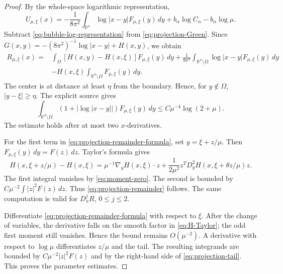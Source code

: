 \documentclass[11pt]{article}
\numberwithin{equation}{section}
\begin{document}
\begin{proof}
By the whole-space logarithmic representation,
\begin{equation}\label{eq:bubble-log-representation}
U_{\mu,\xi}(x)
=-\frac1{8\pi^2}\int_{\mathbb R^4}
\log|x-y|F_{\mu,\xi}(y)\,dy
+b_\alpha\log C_\alpha-b_\alpha\log\mu.
\end{equation}
Subtract \eqref{eq:bubble-log-representation} from
\eqref{eq:projection-Green}. Since
$G(x,y)=-(8\pi^2)^{-1}\log|x-y|+H(x,y)$, we obtain
\begin{equation}\label{eq:projection-remainder-formula}
\begin{aligned}
R_{\mu,\xi}(x)
={}&\int_\Omega[H(x,y)-H(x,\xi)]F_{\mu,\xi}(y)\,dy+\frac1{8\pi^2}\int_{\mathbb R^4\setminus\Omega}
\log|x-y|F_{\mu,\xi}(y)\,dy\\
&-H(x,\xi)\int_{\mathbb R^4\setminus\Omega}
F_{\mu,\xi}(y)\,dy.
\end{aligned}
\end{equation}
The center is at distance at least $\eta$ from the boundary. Hence,
for $y\notin\Omega$,
$|y-\xi|\geq\eta$. The explicit source gives
\begin{equation}\label{eq:projection-tail}
\int_{\mathbb R^4\setminus\Omega}
(1+|\log|x-y||)F_{\mu,\xi}(y)\,dy
\leq C\mu^{-4}\log(2+\mu).
\end{equation}
The estimate holds after at most two $x$-derivatives.

For the first term in \eqref{eq:projection-remainder-formula}, set
$y=\xi+z/\mu$. Then
$F_{\mu,\xi}(y)\,dy=F(z)\,dz$. Taylor's formula gives
\begin{equation}\label{eq:H-Taylor}
H(x,\xi+z/\mu)-H(x,\xi)
=\mu^{-1}\nabla_yH(x,\xi)\cdot z
+\frac1{2\mu^2}z^TD_y^2H(x,\xi+\theta z/\mu)z.
\end{equation}
The first integral vanishes by \eqref{eq:moment-zero}. The second is
bounded by $C\mu^{-2}\int|z|^2F(z)\,dz$. Thus
\eqref{eq:projection-remainder} follows. The same computation is valid
for $D_x^jR$, $0\leq j\leq2$.

Differentiate \eqref{eq:projection-remainder-formula} with respect to
$\xi$. After the change of variables, the derivative falls on the
smooth factor in \eqref{eq:H-Taylor}; the odd first moment still
vanishes. Hence the bound remains $O(\mu^{-2})$. A derivative with
respect to $\log\mu$ differentiates $z/\mu$ and the tail. The resulting
integrands are bounded by $C\mu^{-2}|z|^2F(z)$ and by the right-hand
side of \eqref{eq:projection-tail}. This proves the parameter
estimates.
\end{proof}
\end{document}
